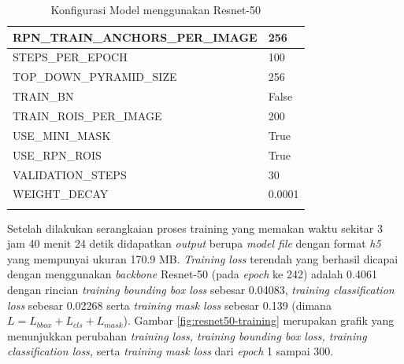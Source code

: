 \begin{longtable}[h!]{|l|l|}
		RPN\_TRAIN\_ANCHORS\_PER\_IMAGE & 256                                                                                                                                                                                    \\ \hline
		STEPS\_PER\_EPOCH               & 100                                                                                                                                                                                    \\ \hline
		TOP\_DOWN\_PYRAMID\_SIZE        & 256                                                                                                                                                                                    \\ \hline
		TRAIN\_BN                       & False                                                                                                                                                                                  \\ \hline
		TRAIN\_ROIS\_PER\_IMAGE         & 200                                                                                                                                                                                    \\ \hline
		USE\_MINI\_MASK                 & True                                                                                                                                                                                   \\ \hline
		USE\_RPN\_ROIS                  & True                                                                                                                                                                                   \\ \hline
		VALIDATION\_STEPS               & 30                                                                                                                                                                                     \\ \hline
		WEIGHT\_DECAY                   & 0.0001  
		\\ \hline 
	\caption{Konfigurasi Model menggunakan Resnet-50 }
	\label{tab:conf-resnet50}
\end{longtable}

Setelah dilakukan serangkaian proses training yang memakan waktu sekitar 3 jam 40 menit 24 detik didapatkan \textit{output} berupa \textit{model file}  dengan format \textit{h5} yang mempunyai ukuran 170.9 MB. \textit{Training loss} terendah yang berhasil dicapai dengan menggunakan \textit{backbone} Resnet-50 (pada \textit{epoch} ke 242) adalah 0.4061 dengan rincian \textit{training bounding box loss} sebesar 0.04083, \textit{training classification loss} sebesar 0.02268 serta \textit{training mask loss} sebesar 0.139 (dimana $L=L_{bbox}+L_{cls}+L_{mask}$). Gambar \ref{fig:resnet50-training} merupakan grafik yang menunjukkan perubahan \textit{training loss, training bounding box loss, training classification loss,} serta \textit{training mask loss} dari \textit{epoch} 1 sampai 300.

